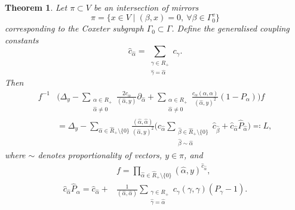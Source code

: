 \documentclass[12pt]{amsart}
\numberwithin{equation}{section}
\newtheorem{theorem}{Theorem}[section]
\theoremstyle{definition}
\begin{document}
\begin{theorem} \label{potential gauge}
Let $\pi \subset V$ be an intersection of mirrors
\begin{equation*}
    \pi = \{x \in V \mid (\beta, x) = 0, \ \forall \beta \in \Gamma^v_0 \}
\end{equation*}
corresponding to the Coxeter subgraph $\Gamma_0 \subset \Gamma$. %
Define the generalised coupling constants
\begin{equation*}
    \widehat{c}_{\widehat{\alpha}} = \sum\limits_{\substack{\gamma \in R_{+} \\ \widehat{\gamma} = \widehat{\alpha}}} c_{\gamma}.
\end{equation*}
Then
\begin{equation}
    \label{Ham}
    \begin{aligned}
        f^{-1}&\bigg( \Delta_y - \sum\limits_{\substack{\alpha \in R_+ \\ \widehat{\alpha} \neq 0}}\frac{2 c_{\alpha}}{(\widehat{\alpha} , y)} \partial_{\widehat{\alpha}} + 
        \sum\limits_{\substack{\alpha \in R_{+} \\ \widehat{\alpha} \neq 0}}\frac{c_{\alpha} (\alpha, \alpha)}{(\widehat{\alpha}, y)^2}(1 - P_{\alpha}) \bigg) f 
        \\
        &= \Delta_y - \sum\limits_{\widehat{\alpha} \in \widehat{R}_+ \setminus \{0\}} \frac{(\widehat{\alpha},\widehat{\alpha})}{(\widehat{\alpha}, y)^2} \bigg(\widehat{c}_{\widehat{\alpha}}\sum\limits_{\substack{\widehat\beta \in \widehat{R}_+ \setminus \{0\} \\\widehat{\beta} \sim \widehat{\alpha}}}\widehat{c}_{\widehat\beta} + \widehat{c}_{\widehat{\alpha}} \widehat{P}_{\widehat{\alpha}} \bigg) \eqqcolon L,
    \end{aligned}
\end{equation}
where $\sim$ denotes proportionality of vectors, $y \in \pi$, and
\begin{align*}
   & f = \prod\limits_{\widehat\alpha \in \widehat{R}_{+} \setminus \{0\} } (\widehat{\alpha}, y )^{\widehat{c}_{\widehat\alpha}}, \nonumber
    \\ 
    \widehat{c}_{\widehat{\alpha}} \widehat{P}_{\widehat{\alpha}} = \widehat{c}_{\widehat{\alpha}} +
    &\frac{1}{(\widehat{\alpha}, \widehat{\alpha})} \sum_{\substack{ \gamma \in R_+ \\\widehat{\gamma} = \widehat{\alpha}}} 
    c_{\gamma}(\gamma, \gamma) (P_{\gamma} - 1). 
\end{align*}
\end{theorem}
\end{document}
